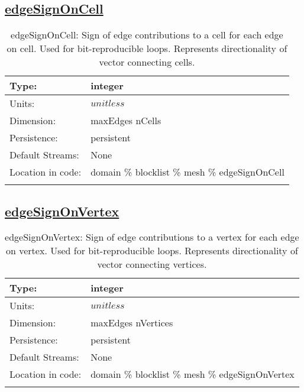 \subsection[edgeSignOnCell]{\hyperref[sec:var_tab_mesh]{edgeSignOnCell}}
\label{subsec:var_sec_mesh_edgeSignOnCell}
\begin{center}
\begin{longtable}{| p{2.0in} | p{4.0in} |}
        \hline 
        Type: & integer \\
        \hline 
        Units: & $unitless$ \\
        \hline 
        Dimension: & maxEdges nCells \\
        \hline 
        Persistence: & persistent \\
        \hline 
		 Default Streams: & None \\
        \hline 
		 Location in code: & domain \% blocklist \% mesh \% edgeSignOnCell \\
		 \hline 
    \caption{edgeSignOnCell: Sign of edge contributions to a cell for each edge on cell. Used for bit-reproducible loops. Represents directionality of vector connecting cells.}
\end{longtable}
\end{center}
\subsection[edgeSignOnVertex]{\hyperref[sec:var_tab_mesh]{edgeSignOnVertex}}
\label{subsec:var_sec_mesh_edgeSignOnVertex}
\begin{center}
\begin{longtable}{| p{2.0in} | p{4.0in} |}
        \hline 
        Type: & integer \\
        \hline 
        Units: & $unitless$ \\
        \hline 
        Dimension: & maxEdges nVertices \\
        \hline 
        Persistence: & persistent \\
        \hline 
		 Default Streams: & None \\
        \hline 
		 Location in code: & domain \% blocklist \% mesh \% edgeSignOnVertex \\
		 \hline 
    \caption{edgeSignOnVertex: Sign of edge contributions to a vertex for each edge on vertex. Used for bit-reproducible loops. Represents directionality of vector connecting vertices.}
\end{longtable}
\end{center}
